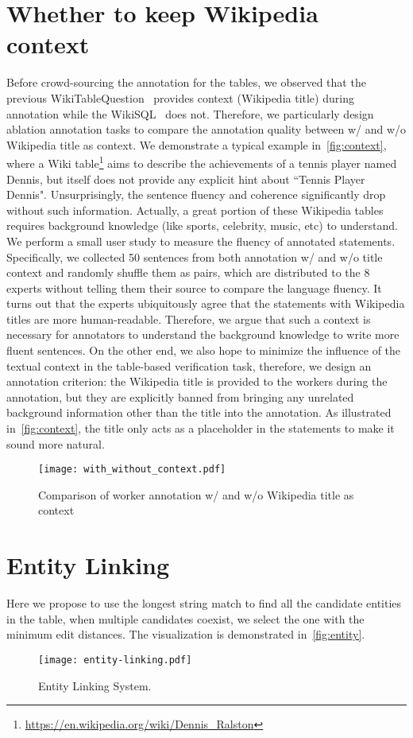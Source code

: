 \documentclass{article} \usepackage{iclr2020_conference,times}
\begin{document}
\section{Whether to keep Wikipedia context}
Before crowd-sourcing the annotation for the tables, we observed that the previous WikiTableQuestion~\cite{pasupat2015compositional} provides context (Wikipedia title) during annotation while the WikiSQL~\cite{zhong2017seq2sql} does not. Therefore, we particularly design ablation annotation tasks to compare the annotation quality between w/ and w/o Wikipedia title as context. We demonstrate a typical example in~\autoref{fig:context}, where a Wiki table\footnote{\url{https://en.wikipedia.org/wiki/Dennis_Ralston}} aims to describe the achievements of a tennis player named Dennis, but itself does not provide any explicit hint about ``Tennis Player Dennis". Unsurprisingly, the sentence fluency and coherence significantly drop without such information. Actually, a great portion of these Wikipedia tables requires background knowledge (like sports, celebrity, music, etc) to understand. We perform a small user study to measure the fluency of annotated statements. Specifically, we collected 50 sentences from both annotation w/ and w/o title context and randomly shuffle them as pairs, which are distributed to the 8 experts without telling them their source to compare the language fluency. It turns out that the experts ubiquitously agree that the statements with Wikipedia titles are more human-readable. Therefore, we argue that such a context is necessary for annotators to understand the background knowledge to write more fluent sentences. On the other end, we also hope to minimize the influence of the textual context in the table-based verification task, therefore, we design an annotation criterion: the Wikipedia title is provided to the workers during the annotation, but they are explicitly banned from bringing any unrelated background information other than the title into the annotation. As illustrated in~\autoref{fig:context}, the title only acts as a placeholder in the statements to make it sound more natural.
\begin{figure}[!h]
    \centering
    \texttt{[image: with\_without\_context.pdf]}
    \caption{Comparison of worker annotation w/ and w/o Wikipedia title as context}
    \label{fig:context}
\end{figure}

\section{Entity Linking}
Here we propose to use the longest string match to find all the candidate entities in the table, when multiple candidates coexist, we select the one with the minimum edit distances. The visualization is demonstrated in~\autoref{fig:entity}.
\begin{figure}[!h]
    \centering
    \texttt{[image: entity-linking.pdf]}
    \caption{Entity Linking System.}
    \label{fig:entity}
\end{figure}
\end{document}
